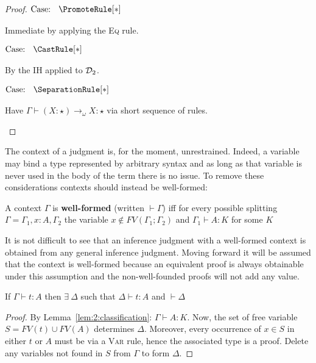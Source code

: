 \begin{proof}
    $\text{Case: }\begin{array}{c} \PromoteRule[*] \end{array}$
    \begin{proofcase}
        Immediate by applying the \textsc{Eq} rule.
    \end{proofcase}

    $\text{Case: }\begin{array}{c} \CastRule[*] \end{array}$
    \begin{proofcase}
        By the IH applied to $\mathcal{D}_{2}$.
    \end{proofcase}

    $\text{Case: }\begin{array}{c} \SeparationRule[*] \end{array}$
    \begin{proofcase}
        Have $\Gamma \vdash (X : \star) \to_\omega X : \star$ via short sequence of rules.
    \end{proofcase}
\end{proof}

The context of a judgment is, for the moment, unrestrained.
Indeed, a variable may bind a type represented by arbitrary syntax and as long as that variable is never used in the body of the term there is no issue.
To remove these considerations contexts should instead be well-formed:
\begin{definition}
    A context $\Gamma$ is \textbf{well-formed} (written $\vdash \Gamma$) iff for every possible splitting $\Gamma = \Gamma_1, x : A, \Gamma_2$ the variable $x \notin FV(\Gamma_1;\Gamma_2)$ and $\Gamma_1 \vdash A : K$ for some $K$
\end{definition}
It is not difficult to see that an inference judgment with a well-formed context is obtained from any general inference judgment.
Moving forward it will be assumed that the context is well-formed because an equivalent proof is always obtainable under this assumption and the non-well-founded proofs will not add any value.
\begin{lemma}
    If $\Gamma \vdash t : A$ then $\exists\ \Delta$ such that $\Delta \vdash t : A$ and $\vdash \Delta$
\end{lemma}
\begin{proof}
    By Lemma~\ref{lem:2:classification}: $\Gamma \vdash A : K$.
    Now, the set of free variable $S = FV(t) \cup FV(A)$ determines $\Delta$.
    Moreover, every occurrence of $x \in S$ in either $t$ or $A$ must be via a \textsc{Var} rule, hence the associated type is a proof.
    Delete any variables not found in $S$ from $\Gamma$ to form $\Delta$.
\end{proof}
